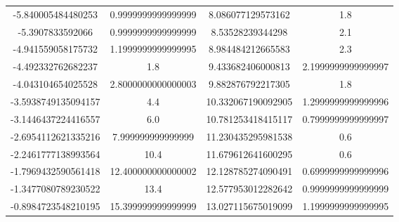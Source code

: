 \begin{table}
\begin{tabular}{S[]S[]S[]S[]}
-5.840005484480253 & 0.9999999999999999   & 8.086077129573162 & 1.8\\
-5.3907833592066 & 0.9999999999999999     & 8.53528239344298 & 2.1\\
-4.941559058175732 & 1.1999999999999995   & 8.984484212665583 & 2.3\\
-4.492332762682237 & 1.8                  & 9.433682406000813 & 2.1999999999999997\\
-4.043104654025528 & 2.8000000000000003   & 9.882876792217305 & 1.8\\
-3.5938749135094157 & 4.4                 & 10.332067190092905 & 1.2999999999999996\\
-3.1446437224416557 & 6.0                 & 10.781253418415117 & 0.7999999999999997\\
-2.6954112621335216 & 7.999999999999999   & 11.230435295981538 & 0.6\\
-2.2461777138993564 & 10.4                & 11.679612641600295 & 0.6\\
-1.7969432590561418 & 12.400000000000002  & 12.128785274090491 & 0.6999999999999996\\
-1.3477080789230522 & 13.4                & 12.577953012282642 & 0.9999999999999999\\
-0.8984723548210195 & 15.399999999999999  & 13.027115675019099 & 1.1999999999999995\\






























\bottomrule
\end{tabular}\end{table}